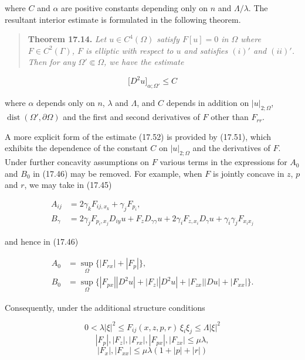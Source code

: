 \providecommand{\R}{\mathbb{R}}
\providecommand{\diam}{\operatorname{diam}}
\providecommand{\dist}{\operatorname{dist}}
\providecommand{\abs}[1]{\left|#1\right|}

where $C$ and $\alpha$ are positive constants depending only on $n$ and $\Lambda/\lambda$. The resultant interior estimate is formulated in the following theorem.

\begin{quote}
\textbf{Theorem 17.14.} \emph{Let $u \in C^4(\Omega)$ satisfy $F[u] = 0$ in $\Omega$ where $F \in C^2(\Gamma)$, $F$ is elliptic with respect to $u$ and satisfies $(i)'$ and $(ii)'$. Then for any $\Omega' \Subset \Omega$, we have the estimate}
\end{quote}

\begin{equation}\tag{17.52}
\bigl[D^2u\bigr]_{\alpha;\Omega'} \le C
\end{equation}

\noindent where $\alpha$ depends only on $n$, $\lambda$ and $\Lambda$, and $C$ depends in addition on $\abs{u}_{2;\Omega}$, $\dist(\Omega', \partial\Omega)$ and the first and second derivatives of $F$ other than $F_{rr}$.

A more explicit form of the estimate (17.52) is provided by (17.51), which exhibits the dependence of the constant $C$ on $\abs{u}_{2;\Omega}$ and the derivatives of $F$. Under further concavity assumptions on $F$ various terms in the expressions for $A_0$ and $B_0$ in (17.46) may be removed. For example, when $F$ is jointly concave in $z$, $p$ and $r$, we may take in (17.45)

\begin{align*}
A_{ij} &= 2\gamma_k F_{ij,x_k} + \gamma_j F_{p_i}, \\
B_\gamma &= 2\gamma_j F_{p_i,x_j} D_{iy}u + F_z D_{\gamma\gamma}u + 2\gamma_i F_{z,x_i} D_\gamma u + \gamma_i\gamma_j F_{x_i x_j}
\end{align*}

\noindent and hence in (17.46)

\begin{align*}
A_0 &= \sup_{\Omega}\bigl\{\abs{F_{rx}} + \abs{F_p}\bigr\}, \\
B_0 &= \sup_{\Omega}\bigl\{\abs{F_{px}}\abs{D^2u} + \abs{F_z}\abs{D^2u} + \abs{F_{zx}}\abs{Du} + \abs{F_{xx}}\bigr\}.
\end{align*}

Consequently, under the additional structure conditions

\begin{equation}\tag{17.53}
0 < \lambda \abs{\xi}^2 \le F_{ij}(x,z,p,r)\,\xi_i \xi_j \le \Lambda \abs{\xi}^2
\end{equation}
\begin{equation*}
\abs{F_p}, \abs{F_z}, \abs{F_{rx}}, \abs{F_{px}}, \abs{F_{zx}} \le \mu \lambda,
\end{equation*}
\begin{equation*}
\abs{F_x}, \abs{F_{xx}} \le \mu\lambda(1 + \abs{p} + \abs{r})
\end{equation*}

